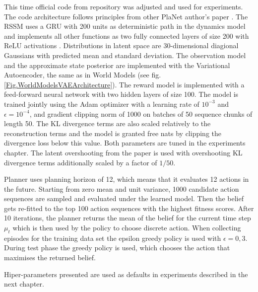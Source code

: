 This time official code from repository \cite{Code.PlaNet} was adjusted and used for experiments. The code architecture follows principles from other PlaNet author's paper \cite{Code.TFAgents}.
The RSSM uses a GRU \cite{Algo.GRU} with 200 units as deterministic path in the dynamics model and implements all other functions as two fully connected layers of size 200 with ReLU activations \cite{Algo.ReLU}. Distributions in latent space are 30-dimensional diagional Gaussians with predicted mean and standard deviation.
The observation model and the approximate state posterior are implemented with the Variational Autoencoder, the same as in World Models (see fig.\ref{Fig.WorldModelsVAEArchitecture}). The reward model is implemented with a feed-forward neural network with two hidden layers of size 100.
The model is trained jointly using the Adam optimizer \cite{Algo.Adam} with a learning rate of $10^{-3}$ and $\epsilon = 10^{−4}$, and gradient clipping norm of 1000 on batches of 50 sequence chunks of length 50. The KL divergence terms are also scaled relatively to the reconstruction terms and the model is granted free nats by clipping the divergence loss below this value. Both parameters are tuned in the experiments chapter. The latent overshooting from the paper \cite{Algo.PlaNet} is used with overshooting KL divergence terms additionally scaled by a factor of $1/50$. 

Planner uses planning horizon of 12, which means that it evaluates 12 actions in the future. Starting from zero mean and unit variance, 1000 candidate action sequences are sampled and evaluated under the learned model. Then the belief gets re-fitted to the top 100 action sequences with the highest fitness scores. After 10 iterations, the planner returns the mean of the belief for the current time step $\mu_t$ which is then used by the policy to choose discrete action. When collecting episodes for the training data set the epsilon greedy policy is used with $\epsilon = 0,3$. During test phase the greedy policy is used, which chooses the action that maximises the returned belief.

Hiper-parameters presented are used as defaults in experiments described in the next chapter.
